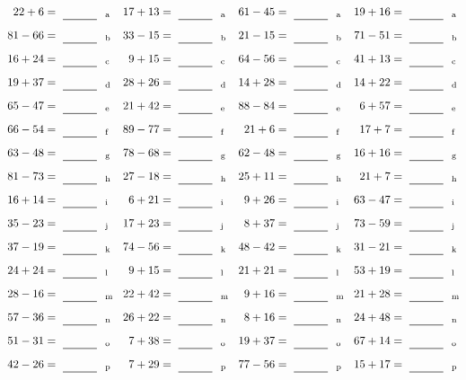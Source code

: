 \documentclass
[
  draft    = true,
  fontsize = 11pt,
  parskip  = half-
]
{scrartcl}
\begin{document}
\clearpage
\begin{align*}
    \pline{22+6}&=\rline{a}
  & \pline{17+13}&=\rline{a}
  & \pline{61-45}&=\rline{a}
  & \pline{19+16}&=\rline{a} \\[1ex]
    \pline{81-66}&=\rline{b}
  & \pline{33-15}&=\rline{b}
  & \pline{21-15}&=\rline{b}
  & \pline{71-51}&=\rline{b} \\[1ex]
    \pline{16+24}&=\rline{c}
  & \pline{9+15}&=\rline{c}
  & \pline{64-56}&=\rline{c}
  & \pline{41+13}&=\rline{c} \\[1ex]
    \pline{19+37}&=\rline{d}
  & \pline{28+26}&=\rline{d}
  & \pline{14+28}&=\rline{d}
  & \pline{14+22}&=\rline{d} \\[1ex]
    \pline{65-47}&=\rline{e}
  & \pline{21+42}&=\rline{e}
  & \pline{88-84}&=\rline{e}
  & \pline{6+57}&=\rline{e} \\[1ex]
    \pline{66-54}&=\rline{f}
  & \pline{89-77}&=\rline{f}
  & \pline{21+6}&=\rline{f}
  & \pline{17+7}&=\rline{f} \\[1ex]
    \pline{63-48}&=\rline{g}
  & \pline{78-68}&=\rline{g}
  & \pline{62-48}&=\rline{g}
  & \pline{16+16}&=\rline{g} \\[1ex]
    \pline{81-73}&=\rline{h}
  & \pline{27-18}&=\rline{h}
  & \pline{25+11}&=\rline{h}
  & \pline{21+7}&=\rline{h} \\[1ex]
    \pline{16+14}&=\rline{i}
  & \pline{6+21}&=\rline{i}
  & \pline{9+26}&=\rline{i}
  & \pline{63-47}&=\rline{i} \\[1ex]
    \pline{35-23}&=\rline{j}
  & \pline{17+23}&=\rline{j}
  & \pline{8+37}&=\rline{j}
  & \pline{73-59}&=\rline{j} \\[1ex]
    \pline{37-19}&=\rline{k}
  & \pline{74-56}&=\rline{k}
  & \pline{48-42}&=\rline{k}
  & \pline{31-21}&=\rline{k} \\[1ex]
    \pline{24+24}&=\rline{l}
  & \pline{9+15}&=\rline{l}
  & \pline{21+21}&=\rline{l}
  & \pline{53+19}&=\rline{l} \\[1ex]
    \pline{28-16}&=\rline{m}
  & \pline{22+42}&=\rline{m}
  & \pline{9+16}&=\rline{m}
  & \pline{21+28}&=\rline{m} \\[1ex]
    \pline{57-36}&=\rline{n}
  & \pline{26+22}&=\rline{n}
  & \pline{8+16}&=\rline{n}
  & \pline{24+48}&=\rline{n} \\[1ex]
    \pline{51-31}&=\rline{o}
  & \pline{7+38}&=\rline{o}
  & \pline{19+37}&=\rline{o}
  & \pline{67+14}&=\rline{o} \\[1ex]
    \pline{42-26}&=\rline{p}
  & \pline{7+29}&=\rline{p}
  & \pline{77-56}&=\rline{p}
  & \pline{15+17}&=\rline{p}
\end{align*}
\end{document}
